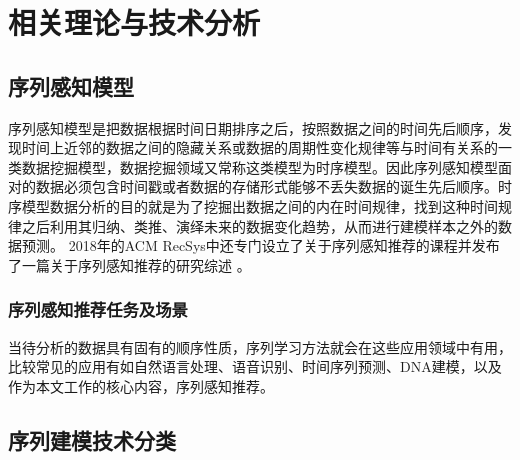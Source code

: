 ﻿%
\chapter{相关理论与技术分析}










\section{序列感知模型}
序列感知模型是把数据根据时间日期排序之后，按照数据之间的时间先后顺序，发现时间上近邻的数据之间的隐藏关系或数据的周期性变化规律等与时间有关系的一类数据挖掘模型，数据挖掘领域又常称这类模型为时序模型。因此序列感知模型面对的数据必须包含时间戳或者数据的存储形式能够不丢失数据的诞生先后顺序。时序模型数据分析的目的就是为了挖掘出数据之间的内在时间规律，找到这种时间规律之后利用其归纳、类推、演绎未来的数据变化趋势，从而进行建模样本之外的数据预测。
2018年的ACM RecSys中还专门设立了关于序列感知推荐的课程并发布了一篇关于序列感知推荐的研究综述
。



\subsection{序列感知推荐任务及场景}

当待分析的数据具有固有的顺序性质，序列学习方法就会在这些应用领域中有用，比较常见的应用有如自然语言处理、语音识别、时间序列预测、DNA建模，以及作为本文工作的核心内容，序列感知推荐。


\section{序列建模技术分类}



